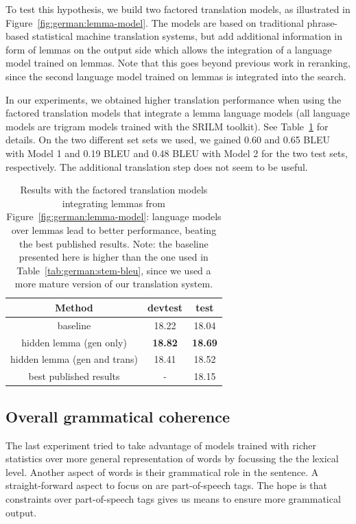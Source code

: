 \documentclass[11pt]{report}
\theoremstyle{plain}
\begin{document}
{To test this hypothesis, we build two factored translation models, as illustrated in Figure~\ref{fig:german:lemma-model}. The models are based on traditional phrase-based statistical machine translation systems, but add additional information in form of lemmas on the output side which allows the integration of a language model trained on lemmas. Note that this goes beyond previous work in reranking, since the second language model trained on lemmas is integrated into the search.

In our experiments, we obtained higher translation performance when using the factored translation models that integrate a lemma language models (all language models are trigram models trained with the SRILM toolkit). See Table~\ref{tab:german:lemma-model} for details. On the two different set sets we used, we gained 0.60 and 0.65 BLEU with Model 1 and 0.19 BLEU and 0.48 BLEU with Model 2 for the two test sets, respectively. The additional translation step does not seem to be useful.

\begin{table}
\begin{center}
\begin{tabular}{|c|c|c|} \hline
\bf Method &  \bf devtest & \bf test\\ \hline
baseline & 18.22 & 18.04 \\ \hline
hidden lemma (gen only) & \bf 18.82 & \bf 18.69 \\ \hline
hidden lemma (gen and trans) & 18.41 & 18.52 \\ \hline
best published results & - & 18.15 \\ \hline
\end{tabular}
\end{center}
\caption{Results with the factored translation models integrating lemmas from Figure~\ref{fig:german:lemma-model}: language models over lemmas lead to better performance, beating the best published results. Note: the baseline presented here is higher than the one used in Table~\ref{tab:german:stem-bleu}, since we used a more mature version of our translation system.}
\label{tab:german:lemma-model}
\end{table}

\subsection{Overall grammatical coherence}
The last experiment tried to take advantage of models trained with richer statistics over more general representation of words by focussing the the lexical level. Another aspect of words is their grammatical role in the sentence. A straight-forward aspect to focus on are part-of-speech tags. The hope is that constraints over part-of-speech tags gives us means to ensure more grammatical output.

}
\end{document}
